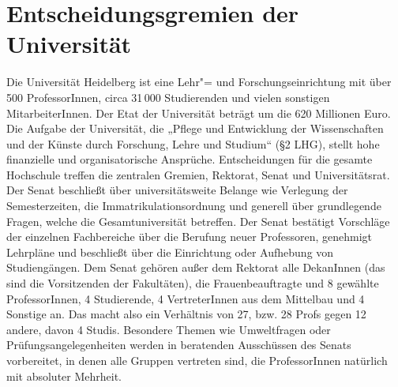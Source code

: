 \section{Entscheidungsgremien der Universität}
Die Universität Heidelberg ist eine Lehr"= und Forschungseinrichtung mit
über 500 ProfessorInnen, circa 31\,000 Studierenden und vielen sonstigen
MitarbeiterInnen. Der Etat der Universität beträgt um die 620 Millionen
Euro. Die Aufgabe der Universität, die „Pflege und Entwicklung der
Wissenschaften und der Künste durch Forschung, Lehre und Studium“ (§2
LHG), stellt hohe finanzielle und organisatorische Ansprüche.
Entscheidungen für die gesamte Hochschule treffen die zentralen Gremien,
Rektorat, Senat und Universitätsrat. Der Senat beschließt über
universitätsweite Belange wie Verlegung der Semesterzeiten, die
Immatrikulationsordnung und generell über grundlegende Fragen, welche die
Gesamtuniversität betreffen. Der Senat bestätigt Vorschläge der einzelnen
Fachbereiche über die Berufung neuer Professoren, genehmigt Lehrpläne und
beschließt über die Einrichtung oder Aufhebung von Studiengängen. Dem
Senat gehören außer dem Rektorat alle DekanInnen (das sind die
Vorsitzenden der Fakultäten), die Frauenbeauftragte und 8 gewählte
ProfessorInnen, 4 Studierende, 4 VertreterInnen aus dem Mittelbau und 4
Sonstige an. Das macht also ein Verhältnis von 27, bzw. 28 Profs gegen 12
andere, davon 4 Studis. Besondere Themen wie Umweltfragen oder
Prüfungsangelegenheiten werden in beratenden Ausschüssen des Senats
vorbereitet, in denen alle Gruppen vertreten sind, die ProfessorInnen
natürlich mit absoluter Mehrheit.

